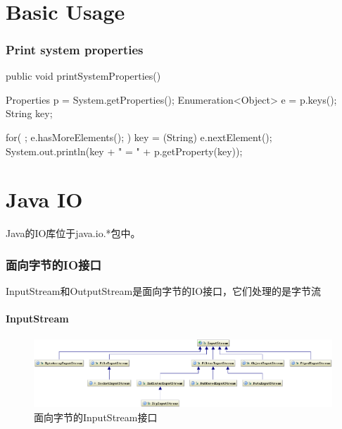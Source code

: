 \documentclass[a4paper,11pt]{article}
\begin{document}
\tt %
\pagestyle{header}
\sybmaketitle
\tableofcontents
\newpage

\pagestyle{main}
\setcounter{page}{1}

\part[Basic Usage]{Basic Usage}



\section[Print system properties]{Print system properties}
\begin{javacode}
public void printSystemProperties() {
  Properties p = System.getProperties();
  Enumeration<Object> e = p.keys();
  String key;

  for( ; e.hasMoreElements(); ) {
    key = (String) e.nextElement();
    System.out.println(key + " = " + p.getProperty(key));
  }
}
\end{javacode}












\part[Java IO]{Java IO}
Java的IO库位于java.io.*包中。

\section[面向字节的IO接口]{面向字节的IO接口}
InputStream和OutputStream是面向字节的IO接口，它们处理的是字节流

\subsection[InputStream]{InputStream}
\begin{figure}
  \centering
  \includegraphics[width=.9\textwidth]{picturedir/inputstream.png}
  \caption{面向字节的InputStream接口}
  \label{fig:inputstream}
\end{figure}
\end{document}
